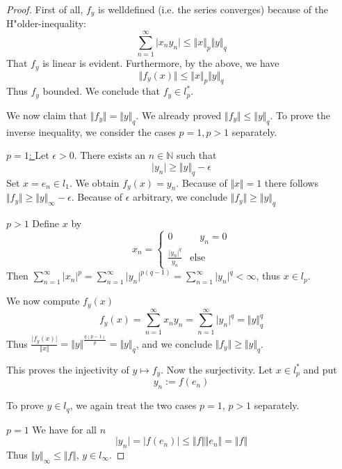 \begin{proof}
	First of all, $f_y$ is welldefined (i.e. the series converges) because of the H"older-inequality:
    \[
        \sum_{n=1}^{\infty}\vert x_n y_n \vert \leq \Vert x \Vert_p \Vert y \Vert_q
    \]
    That $f_y$ is linear is evident. Furthermore, by the above, we have
	\[
		\Vert f_y(x) \Vert  \leq \Vert x \Vert_p \Vert y \Vert_q
	\]
	Thus $f_y$ bounded. We conclude that $f_y \in l_p^{\ast}$.

	We now claim that $\Vert f_y \Vert = \Vert y \Vert_q$. We already proved $\Vert f_y \Vert \leq \Vert y \Vert_q$. 
	To prove the inverse inequality, we consider the cases $p=1, p>1$ separately.

	\underline{$p=1$: } Let $\epsilon>0$. There exists an $n \in \mathbb{N}$ such that
	\[
		\vert y_n \vert \geq \Vert y \Vert_q -\epsilon
	\]
	Set $x=e_n \in l_1$. We obtain $f_y(x)=y_n$. Because of $\Vert x \Vert =1$ 
	there follows $\Vert f_y \Vert\geq \Vert y\Vert_{\infty} - \epsilon$. 
	Because of $\epsilon$ arbitrary, we conclude $\Vert f_y \Vert \geq \Vert y \Vert_q$

	\underline{$p>1$} Define $x$ by
	\[
	x_n = \begin{cases} 0 & \quad y_n=0 \\
                  \frac{\vert y_n \vert^q}{y_n} &\text{else}
			\end{cases}
	\]
	Then $\sum_{n=1}^{\infty}\vert x_n \vert^p = \sum_{n=1}^{\infty} \vert y_n \vert^{p(q-1)}=\sum_{n=1}^{\infty} \vert y_n 			\vert^{q}<\infty$, thus $x \in l_p$.
	
	We now compute $f_y(x)$
	\[
		f_y(x)=\sum_{n=1}^{\infty}x_ny_n= \sum_{n=1}^{\infty}\vert y_n \vert^q = \Vert y \Vert_q^q
	\]
	Thus $\frac{\vert f_y(x) \vert}{\Vert x \Vert} =\Vert y \Vert ^{\frac{q(p-1)}{p}}=\Vert y \Vert_q$, and we conclude $\Vert f_y 	\Vert \geq \Vert y \Vert_q$.

	This proves the injectivity of $y \mapsto f_y$. Now the surjectivity. Let $x \in l_p^{\ast}$ and put
	\[
		y_n:=f(e_n)
	\]
	
	To prove $y \in l_q$, we again treat the two cases $p=1$, $p>1$ separately.
	
	\underline{$p=1$} We have for all $n$
 	\[
		\vert y_n \vert = \vert f(e_n) \vert \leq \Vert f \Vert \Vert e_n \Vert = \Vert f\Vert
	\]
	Thus $\Vert y \Vert_{\infty} \leq \Vert f \Vert$, $y \in l_{\infty}$.
	

\end{proof}
